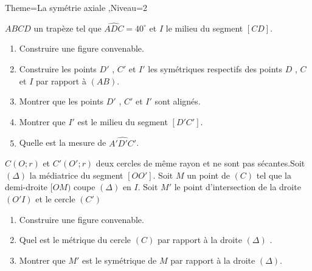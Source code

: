 \documentclass[a4paper,12pt]{article}
\begin{document}
\begin{Maquette}[Fiche]{Theme=La symétrie axiale ,Niveau=2}
\begin{exercice}
$ABCD$ un trapèze tel que $\widehat{ADC}=40^{\circ}$ et $I$ le milieu du segment $[CD]$.
\begin{enumerate}
\item Construire une figure convenable.
\item Construire les points $D'$ , $C'$ et $I'$ les symétriques respectifs des points $D$ , $C$ et $I$ par rapport à $(AB)$.
\item Montrer que les points $D'$ , $C'$ et $I'$ sont alignés.
\item Montrer que $I'$ est le milieu du segment $[D'C']$.
\item Quelle est la mesure de $\widehat{A'D'C'}$.
\end{enumerate}
\end{exercice}

\begin{exercice}
$C(O;r)$ et $C'(O';r)$ deux cercles de même rayon et ne sont pas sécantes.Soit $(\Delta)$ la médiatrice du segment $[OO']$.
Soit $M$ un point de $(C)$ tel que la demi-droite $[OM)$ coupe $(\Delta)$ en $I$. Soit $M'$ le point d'intersection de la droite $(O'I)$ et le cercle $(C')$
\begin{enumerate}
\item Construire une figure convenable.
\item Quel est le métrique du cercle $(C)$ par rapport à la droite  $(\Delta)$ .
\item Montrer que $M'$ est le symétrique de $M$ par rapport à la droite  $(\Delta)$.
\end{enumerate}
\end{exercice}





\end{Maquette}
\end{document}
